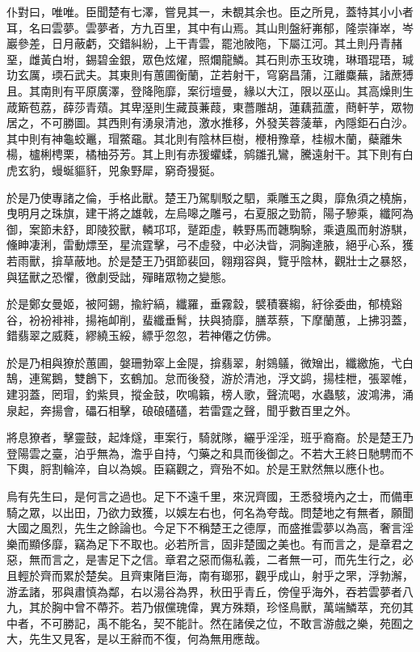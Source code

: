 仆對曰，唯唯。臣聞楚有七澤，嘗見其一，未覩其余也。臣之所見，蓋特其小小者耳，名曰雲夢。雲夢者，方九百里，其中有山焉。其山則盤紆岪郁，隆崇嵂崒，岑巖參差，日月蔽虧，交錯糾紛，上干青雲，罷池陂陁，下屬江河。其土則丹青赭堊，雌黃白坿，錫碧金銀，眾色炫燿，照爛龍鱗。其石則赤玉玫瑰，琳瑉琨珸，瑊玏玄厲，瑌石武夫。其東則有蕙圃衡蘭，芷若射干，穹窮昌蒲，江離麋蕪，諸蔗猼且。其南則有平原廣澤，登降陁靡，案衍壇曼，緣以大江，限以巫山。其高燥則生葴簛苞荔，薛莎青薠。其卑溼則生藏莨蒹葭，東薔雕胡，蓮藕菰蘆，蔄軒芋，眾物居之，不可勝圖。其西則有湧泉清池，激水推移，外發芙蓉蔆華，內隱鉅石白沙。其中則有神龜蛟鼉，瑁鱉黿。其北則有陰林巨樹，楩枏豫章，桂椒木蘭，蘗離朱楊，櫨梸梬栗，橘柚芬芳。其上則有赤猨蠷蝚，鹓雛孔鸞，騰遠射干。其下則有白虎玄豹，蟃蜒貙豻，兕象野犀，窮奇獌狿。

於是乃使專諸之倫，手格此獸。楚王乃駕馴駁之駟，乘雕玉之輿，靡魚須之橈旃，曳明月之珠旗，建干將之雄戟，左烏嗥之雕弓，右夏服之勁箭，陽子驂乘，纖阿為御，案節未舒，即陵狡獸，轔邛邛，蹵距虛，軼野馬而韢騊駼，乘遺風而射游騏，儵眒凄浰，雷動熛至，星流霆擊，弓不虛發，中必決眥，洞胸達腋，絕乎心系，獲若雨獸，揜草蔽地。於是楚王乃弭節裴回，翱翔容與，覽乎陰林，觀壯士之暴怒，與猛獸之恐懼，徼劇受詘，殫睹眾物之變態。

於是鄭女曼姬，被阿錫，揄紵縞，纖羅，垂霧縠，襞積褰縐，紆徐委曲，郁橈谿谷，衯衯裶裶，揚袘卹削，蜚纖垂髾，扶與猗靡，膳萃蔡，下摩蘭蕙，上拂羽蓋，錯翡翠之威蕤，繆繞玉綏，縹乎忽忽，若神僊之仿佛。

於是乃相與獠於蕙圃，媻珊勃窣上金隄，揜翡翠，射鵕鸃，微矰出，纖繳施，弋白鵠，連駕鵝，雙鶬下，玄鶴加。怠而後發，游於清池，浮文鹢，揚桂枻，張翠帷，建羽蓋，罔瑁，釣紫貝，摐金鼓，吹鳴籟，榜人歌，聲流喝，水蟲駭，波鴻沸，涌泉起，奔揚會，礧石相擊，硠硠礚礚，若雷霆之聲，聞乎數百里之外。

將息獠者，擊靈鼓，起烽燧，車案行，騎就隊，纚乎淫淫，班乎裔裔。於是楚王乃登陽雲之臺，泊乎無為，澹乎自持，勺藥之和具而後御之。不若大王終日馳騁而不下輿，脟割輪淬，自以為娛。臣竊觀之，齊殆不如。於是王默然無以應仆也。

烏有先生曰，是何言之過也。足下不遠千里，來況齊國，王悉發境內之士，而備車騎之眾，以出田，乃欲力致獲，以娛左右也，何名為夸哉。問楚地之有無者，願聞大國之風烈，先生之餘論也。今足下不稱楚王之德厚，而盛推雲夢以為高，奢言淫樂而顯侈靡，竊為足下不取也。必若所言，固非楚國之美也。有而言之，是章君之惡，無而言之，是害足下之信。章君之惡而傷私義，二者無一可，而先生行之，必且輕於齊而累於楚矣。且齊東陼巨海，南有瑯邪，觀乎成山，射乎之罘，浮勃澥，游孟諸，邪與肅慎為鄰，右以湯谷為界，秋田乎青丘，傍偟乎海外，吞若雲夢者八九，其於胸中曾不蔕芥。若乃俶儻瑰偉，異方殊類，珍怪鳥獸，萬端鱗萃，充仞其中者，不可勝記，禹不能名，契不能計。然在諸侯之位，不敢言游戲之樂，苑囿之大，先生又見客，是以王辭而不復，何為無用應哉。

